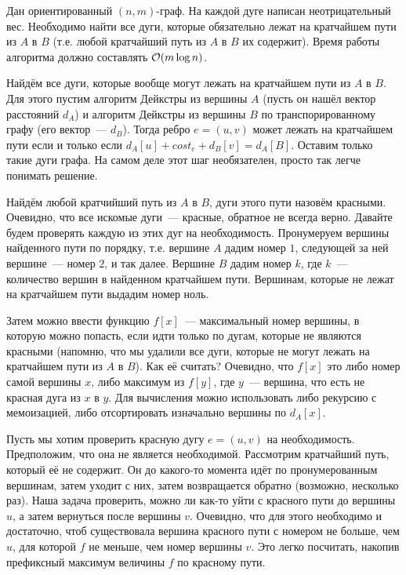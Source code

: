\documentclass[addpoints]{exam}
\begin{document}
\begin{questions}

\question[2 \half] Дан ориентированный $(n,m)$-граф. На каждой дуге написан неотрицательный вес. Необходимо найти все дуги, которые обязательно лежат на кратчайшем пути из $A$ в $B$ (т.е. любой кратчайший путь из $A$ в $B$ их содержит). Время работы алгоритма должно составлять $\mathcal{O}(m \log{n})$.
  
\begin{solution}

Найдём все дуги, которые вообще могут лежать на кратчайшем пути из $A$ в $B$. Для этого пустим алгоритм Дейкстры из вершины $A$ (пусть он нашёл вектор расстояний $d_A$) и алгоритм Дейкстры из вершины $B$ по транспорированному графу (его вектор~--- $d_B$). Тогда ребро $e=(u,v)$ может лежать на кратчайшем пути если и только если $d_A[u] + cost_e + d_B[v] = d_A[B]$. Оставим только такие дуги графа. На самом деле этот шаг необязателен, просто так легче понимать решение.

Найдём любой кратчийший путь из $A$ в $B$, дуги этого пути назовём красными. Очевидно, что все искомые дуги~--- красные, обратное не всегда верно. Давайте будем проверять каждую из этих дуг на необходимость. Пронумеруем вершины найденного пути по порядку, т.е. вершине $A$ дадим номер $1$, следующей за ней вершине~--- номер $2$, и так далее. Вершине $B$ дадим номер $k$, где $k$~--- количество вершин в найденном кратчайшем пути. Вершинам, которые не лежат на кратчайшем пути выдадим номер ноль.

Затем можно ввести функцию $f[x]$~--- максимальный номер вершины, в которую можно попасть, если идти только по дугам, которые не являются красными (напомню, что мы удалили все дуги, которые не могут лежать на кратчайшем пути из $A$ в $B$). Как её считать? Очевидно, что $f[x]$ это либо номер самой вершины $x$, либо максимум из $f[y]$, где $y$~--- вершина, что есть не красная дуга из $x$ в $y$. Для вычисления можно использовать либо рекурсию с мемоизацией, либо отсортировать изначально вершины по $d_A[x]$.

Пусть мы хотим проверить красную дугу $e=(u,v)$ на необходимость. Предположим, что она не является необходимой. Рассмотрим кратчайший путь, который её не содержит. Он до какого-то момента идёт по пронумерованным вершинам, затем уходит с них, затем возвращается обратно (возможно, несколько раз). Наша задача проверить, можно ли как-то уйти с красного пути до вершины $u$, а затем вернуться после вершины $v$. Очевидно, что для этого необходимо и достаточно, чтоб существовала вершина красного пути с номером не больше, чем $u$, для которой $f$ не меньше, чем номер вершины $v$. Это легко посчитать, накопив префиксный максимум величины $f$ по красному пути.


\end{solution}
\end{questions}
\end{document}
